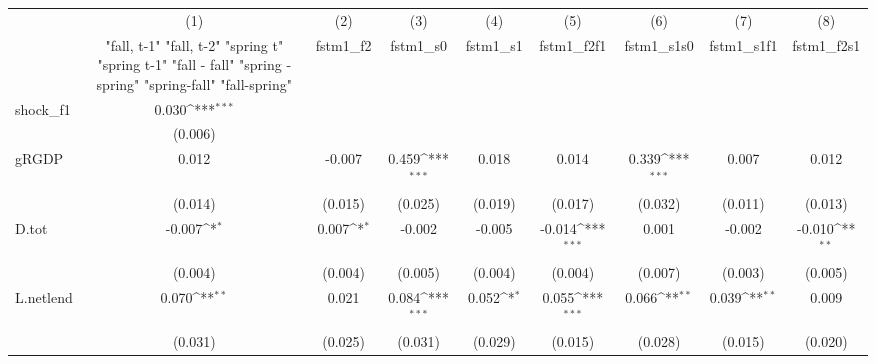 {
\def\sym#1{\ifmmode^{#1}\else\(^{#1}\)\fi}
\begin{tabular}{l*{8}{c}}
\toprule
            &\multicolumn{1}{c}{(1)}&\multicolumn{1}{c}{(2)}&\multicolumn{1}{c}{(3)}&\multicolumn{1}{c}{(4)}&\multicolumn{1}{c}{(5)}&\multicolumn{1}{c}{(6)}&\multicolumn{1}{c}{(7)}&\multicolumn{1}{c}{(8)}\\
            &\multicolumn{1}{c}{  "fall, t-1" "fall, t-2" "spring t" "spring t-1"  "fall - fall" "spring - spring" "spring-fall" "fall-spring" }&\multicolumn{1}{c}{fstm1\_f2}&\multicolumn{1}{c}{fstm1\_s0}&\multicolumn{1}{c}{fstm1\_s1}&\multicolumn{1}{c}{fstm1\_f2f1}&\multicolumn{1}{c}{fstm1\_s1s0}&\multicolumn{1}{c}{fstm1\_s1f1}&\multicolumn{1}{c}{fstm1\_f2s1}\\
\midrule
shock\_f1    &       0.030\sym{***}&                     &                     &                     &                     &                     &                     &                     \\
            &     (0.006)         &                     &                     &                     &                     &                     &                     &                     \\
\addlinespace
gRGDP       &       0.012         &      -0.007         &       0.459\sym{***}&       0.018         &       0.014         &       0.339\sym{***}&       0.007         &       0.012         \\
            &     (0.014)         &     (0.015)         &     (0.025)         &     (0.019)         &     (0.017)         &     (0.032)         &     (0.011)         &     (0.013)         \\
\addlinespace
D.tot       &      -0.007\sym{*}  &       0.007\sym{*}  &      -0.002         &      -0.005         &      -0.014\sym{***}&       0.001         &      -0.002         &      -0.010\sym{**} \\
            &     (0.004)         &     (0.004)         &     (0.005)         &     (0.004)         &     (0.004)         &     (0.007)         &     (0.003)         &     (0.005)         \\
\addlinespace
L.netlend   &       0.070\sym{**} &       0.021         &       0.084\sym{***}&       0.052\sym{*}  &       0.055\sym{***}&       0.066\sym{**} &       0.039\sym{**} &       0.009         \\
            &     (0.031)         &     (0.025)         &     (0.031)         &     (0.029)         &     (0.015)         &     (0.028)         &     (0.015)         &     (0.020)         \\

\end{tabular}}
